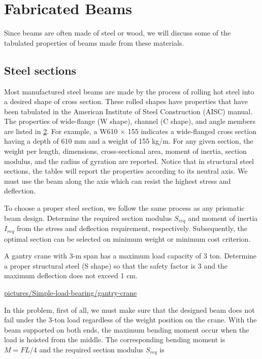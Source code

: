 \documentclass[a4paper,openany,12pt]{book}
\begin{document}
{{\section{Fabricated Beams}
\label{fabricated-beams}
Since beams are often made of steel or wood, we will discuss some of the
tabulated properties of beams made from these materials.

\subsection{Steel sections}
\label{steel-sections}
Most manufactured steel beams are made by the process of rolling hot
steel into a desired shape of cross section. These rolled shapes have
properties that have been tabulated in the American Institute of Steel
Construction (AISC) manual. The properties of wide-flange (W shape),
channel (C shape), and angle members are listed in
\hyperref[appendix: structural steel properties]{2}. For example, a W610
\(\times\) 155 indicates a wide-flanged cross section having a depth of
610 mm and a weight of 155 kg/m. For any given section, the weight per
length, dimensions, cross-sectional area, moment of inertia, section
modulus, and the radius of gyration are reported. Notice that in
structural steel sections, the tables will report the properties
according to its neutral axis. We must use the beam along the axis which
can resist the highest stress and deflection.


\hspace{1cm}
\hspace{1cm}
\hspace{1cm}
To choose a proper steel section, we follow the same process as any
prismatic beam design. Determine the required section modulus \(S_{req}\)
and moment of inertia \(I_{req}\) from the stress and deflection
requirement, respectively. Subsequently, the optimal section can be
selected on minimum weight or minimum cost criterion.

A gantry crane with 3-m span has a maximum load capacity of 3 ton.
Determine a proper structural steel (S shape) so that the safety factor
is 3 and the maximum deflection does not exceed 1 cm.


\url{pictures/Simple-load-bearing/gantry-crane}

In this problem, first of all, we must make sure that the designed beam
does not fail under the 3-ton load regardless of the weight position on
the crane. With the beam supported on both ends, the maximum bending
moment occur when the load is hoisted from the middle. The corresponding
bending moment is \(M = FL / 4\) and the required section modulus
\(S_{req}\) is

}}
\end{document}

